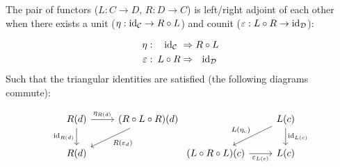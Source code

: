 \begin{definition}
  The pair of functors ($L: C\to D$, $R: D\to C$) is left/right adjoint of each
  other when there exists a unit ($\eta: \mathrm{id}_{\mathcal{C}}\to R\circ L$) and counit
  ($\varepsilon: L\circ R \to \mathrm{id}_{\mathcal{D}}$):
  \parencite{leinster:basic_category_theory}

  \[
    \begin{aligned}
      \eta:&\!\!\!&\mathrm{id}_{\mathcal{C}}\ &\Rightarrow R \circ L\\
      \varepsilon:&\!\!\!& L \circ R &\Rightarrow\ \ \mathrm{id}_{\mathcal{D}}
    \end{aligned}
  \]
  Such that the triangular identities are satisfied (the following diagrams
  commute):

  \[\begin{tikzcd}[ampersand replacement=\&]
    {R(d)} \& {(R\circ L\circ R)(d)} \\
    {R(d)}
    \arrow["{\eta_{R(d)}}", from=1-1, to=1-2]
    \arrow["{R(\varepsilon_d)}", from=1-2, to=2-1]
    \arrow["{\id_{R(d)}}"', from=1-1, to=2-1]
  \end{tikzcd}
  \begin{tikzcd}[ampersand replacement=\&]
    \& {L(c)} \\
    {(L\circ R\circ L)(c)} \& {L(c)}
    \arrow["{L(\eta_c)}"', from=1-2, to=2-1]
    \arrow["{\varepsilon_{L(c)}}"', from=2-1, to=2-2]
    \arrow["{\id_{L(c)}}", from=1-2, to=2-2]
  \end{tikzcd}
  \]
\end{definition}

